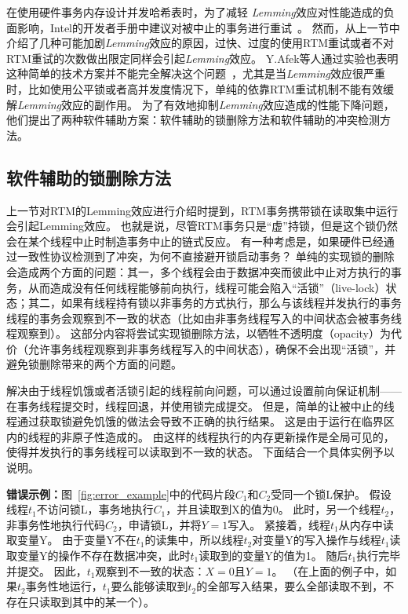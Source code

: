 在使用硬件事务内存设计并发哈希表时，为了减轻
\textit{Lemming}效应对性能造成的负面影响，Intel的开发者手册中建议对被中止的事务进行重试~\cite{Intel2015Intel}。
然而，从上一节中介绍了几种可能加剧\textit{Lemming}效应的原因，过快、过度的使用RTM重试或者不对RTM重试的次数做出限定同样会引起\textit{Lemming}效应。
Y.Afek等人通过实验也表明这种简单的技术方案并不能完全解决这个问题~\cite{Afek2014Software}，尤其是当\textit{Lemming}效应很严重时，比如使用公平锁或者高并发度情况下，单纯的依靠RTM重试机制不能有效缓解\textit{Lemming}效应的副作用。
为了有效地抑制\textit{Lemming}效应造成的性能下降问题，他们提出了两种软件辅助方案：软件辅助的锁删除方法和软件辅助的冲突检测方法。

\subsection{软件辅助的锁删除方法}

上一节对RTM的Lemming效应进行介绍时提到，RTM事务携带锁在读取集中运行会引起Lemming效应。
也就是说，尽管RTM事务只是“虚”持锁，但是这个锁仍然会在某个线程中止时制造事务中止的链式反应。
有一种考虑是，如果硬件已经通过一致性协议检测到了冲突，为何不直接避开锁启动事务？
单纯的实现锁的删除会造成两个方面的问题：其一，多个线程会由于数据冲突而彼此中止对方执行的事务，从而造成没有任何线程能够前向执行，线程可能会陷入“活锁”（live-lock）状态；其二，如果有线程持有锁以非事务的方式执行，那么与该线程并发执行的事务线程的事务会观察到不一致的状态（比如由非事务线程写入的中间状态会被事务线程观察到）。
这部分内容将尝试实现锁删除方法，以牺牲不透明度（opacity）为代价（允许事务线程观察到非事务线程写入的中间状态），确保不会出现“活锁”，并避免锁删除带来的两个方面的问题。

解决由于线程饥饿或者活锁引起的线程前向问题，可以通过设置前向保证机制——在事务线程提交时，线程回退，并使用锁完成提交。
但是，简单的让被中止的线程通过获取锁避免饥饿的做法会导致不正确的执行结果。
这是由于运行在临界区内的线程的非原子性造成的。
由这样的线程执行的内存更新操作是全局可见的，使得并发执行的事务线程可以读取到不一致的状态。
下面结合一个具体实例予以说明。

\textbf{错误示例：}图~\ref{fig:error_example}中的代码片段$C_1$和$C_2$受同一个锁L保护。
假设线程$t_1$不访问锁L，事务地执行$C_1$，并且读取到X的值为0。
此时，另一个线程$t_2$，非事务性地执行代码$C_2$，申请锁L，并将$Y = 1$写入。
紧接着，线程$t_1$从内存中读取变量Y。
由于变量Y不在$t_1$的读集中，所以线程$t_2$对变量Y的写入操作与线程$t_1$读取变量Y的操作不存在数据冲突，此时$t_1$读取到的变量Y的值为1。
随后$t_1$执行完毕并提交。
因此，$t_1$观察到不一致的状态：$X = 0$且$Y = 1$。
（在上面的例子中，如果$t_2$事务性地运行，$t_1$要么能够读取到$t_2$的全部写入结果，要么全部读取不到，不存在只读取到其中的某一个）。

